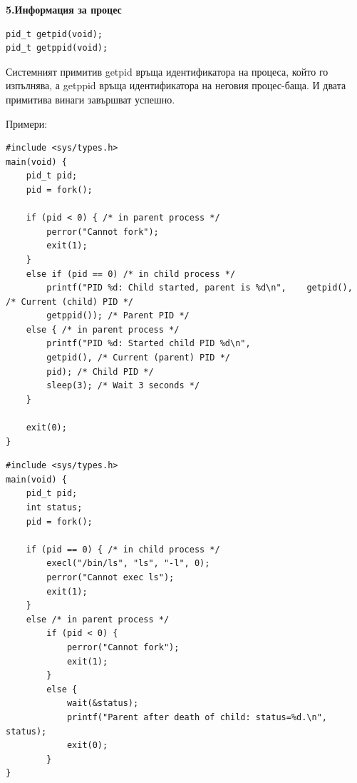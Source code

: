 \documentclass{article}
\begin{document}
\textbf{5.Информация за процес}
\begin{lstlisting}[style=CStyle]
pid_t getpid(void);
pid_t getppid(void);
\end{lstlisting}
Системният примитив getpid връща идентификатора на процеса, който го изпълнява, а getppid връща идентификатора на неговия
процес-баща. И двата примитива винаги завършват успешно.

Примери:

\begin{lstlisting}[style=CStyle]
#include <sys/types.h>
main(void) {
    pid_t pid;
    pid = fork();
    
    if (pid < 0) { /* in parent process */
        perror("Cannot fork");
        exit(1);
    }
    else if (pid == 0) /* in child process */
        printf("PID %d: Child started, parent is %d\n",    getpid(), /* Current (child) PID */
        getppid()); /* Parent PID */
    else { /* in parent process */
        printf("PID %d: Started child PID %d\n",
        getpid(), /* Current (parent) PID */
        pid); /* Child PID */
        sleep(3); /* Wait 3 seconds */
    }
    
    exit(0);
} 
\end{lstlisting}

\begin{lstlisting}[style=CStyle]
#include <sys/types.h>
main(void) {
    pid_t pid;
    int status;
    pid = fork();
    
    if (pid == 0) { /* in child process */
        execl("/bin/ls", "ls", "-l", 0);
        perror("Cannot exec ls");
        exit(1);
    }
    else /* in parent process */
        if (pid < 0) {
            perror("Cannot fork");
            exit(1);
        }
        else {
            wait(&status);
            printf("Parent after death of child: status=%d.\n", status);
            exit(0);
        }
}
\end{lstlisting}
\end{document}
